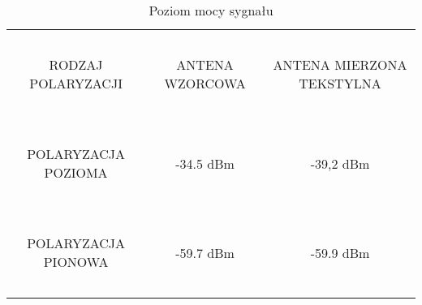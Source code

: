 \newpage 
\begin{table}[h]
\begin{center}
    \begin{tabular}{|c|c|c|}
    \hline
    ~                     & ~               & ~                         \\
     RODZAJ POLARYZACJI    & ANTENA WZORCOWA & ANTENA MIERZONA TEKSTYLNA \\
    ~                     & ~               & ~                         \\ \hline
    ~                     & ~               & ~                         \\
     POLARYZACJA POZIOMA  & -34.5 dBm       & -39,2 dBm                 \\
    ~                     & ~               & ~                         \\ \hline
    ~                     & ~               & ~                         \\
     POLARYZACJA PIONOWA  & -59.7 dBm       & -59.9 dBm                 \\
    ~                     & ~               & ~                         \\ \hline
    \end{tabular}
    \caption{Poziom mocy sygnału}
\end{center}
\end{table}




